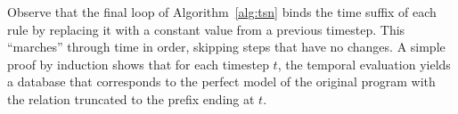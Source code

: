 Observe that the final loop of Algorithm~\ref{alg:tsn} binds the time suffix of each rule by replacing it with a constant value from a previous timestep.  This ``marches'' through time in order, skipping steps that have no changes.  A simple proof by induction shows that for each timestep $t$, the temporal evaluation yields a database that corresponds to the perfect model of the original \slang program with the  relation truncated to the prefix ending at $t$.
